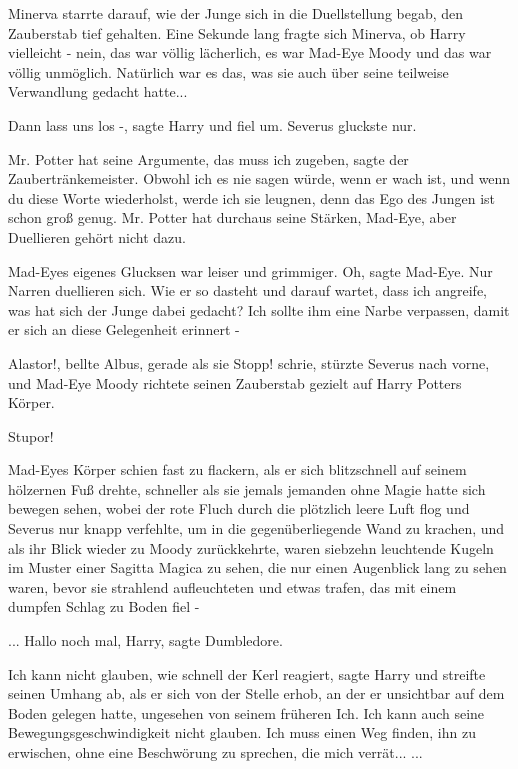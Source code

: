 Minerva starrte darauf, wie der Junge sich in die Duellstellung begab, den
Zauberstab tief gehalten. Eine Sekunde lang fragte sich Minerva, ob Harry
vielleicht - nein, das war völlig lächerlich, es war Mad-Eye Moody und das war
völlig unmöglich. Natürlich war es das, was sie auch über seine teilweise
Verwandlung gedacht hatte...

\glqq{}Dann lass uns los -\grqq{}, sagte Harry und fiel um. Severus gluckste nur.

\glqq{}Mr. Potter hat seine Argumente, das muss ich zugeben\grqq{}, sagte der
Zaubertränkemeister. \glqq{}Obwohl ich es nie sagen würde, wenn er wach ist, und
wenn du diese Worte wiederholst, werde ich sie leugnen, denn das Ego des Jungen
ist schon groß genug. Mr. Potter hat durchaus seine Stärken, Mad-Eye, aber
Duellieren gehört nicht dazu.\grqq{}

Mad-Eyes eigenes Glucksen war leiser und grimmiger. \glqq{}Oh\grqq{}, sagte
Mad-Eye. \glqq{}Nur Narren duellieren sich. Wie er so dasteht und darauf wartet,
dass ich angreife, was hat sich der Junge dabei gedacht? Ich sollte ihm eine
Narbe verpassen, damit er sich an diese Gelegenheit erinnert -\grqq{}

\glqq{}Alastor!\grqq{}, bellte Albus, gerade als sie \glqq{}Stopp!\grqq{} schrie,
stürzte Severus nach vorne, und Mad-Eye Moody richtete seinen Zauberstab gezielt
auf Harry Potters Körper.

\glqq{}Stupor!\grqq{}

Mad-Eyes Körper schien fast zu flackern, als er sich blitzschnell auf seinem
hölzernen Fuß drehte, schneller als sie jemals jemanden ohne Magie hatte sich
bewegen sehen, wobei der rote Fluch durch die plötzlich leere Luft flog und
Severus nur knapp verfehlte, um in die gegenüberliegende Wand zu krachen, und
als ihr Blick wieder zu Moody zurückkehrte, waren siebzehn leuchtende Kugeln im
Muster einer Sagitta Magica zu sehen, die nur einen Augenblick lang zu sehen
waren, bevor sie strahlend aufleuchteten und etwas trafen, das mit einem dumpfen
Schlag zu Boden fiel -

... \glqq{}Hallo noch mal, Harry\grqq{}, sagte Dumbledore.

\glqq{}Ich kann nicht glauben, wie schnell der Kerl reagiert\grqq{}, sagte Harry
und streifte seinen Umhang ab, als er sich von der Stelle erhob, an der er
unsichtbar auf dem Boden gelegen hatte, ungesehen von seinem früheren Ich. \glqq{}
Ich kann auch seine Bewegungsgeschwindigkeit nicht glauben. Ich muss einen Weg
finden, ihn zu erwischen, ohne eine Beschwörung zu sprechen, die mich
verrät...\grqq{} ...


